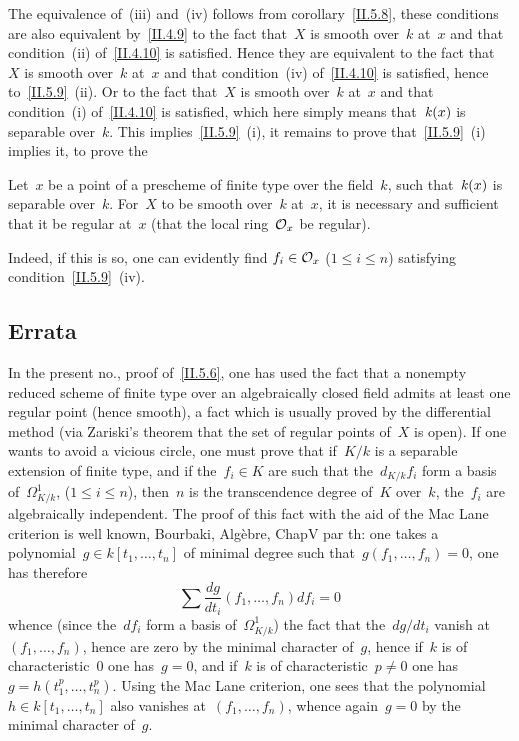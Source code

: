 The equivalence of~(iii) and~(iv) follows from
corollary~\ref{II.5.8}, these conditions are also equivalent
by~\ref{II.4.9} to the fact that~$X$ is smooth over~$k$ at~$x$ and
that condition~(ii)
of~\ref{II.4.10}
is satisfied. Hence they are equivalent to the fact that~$X$ is
smooth over~$k$ at~$x$ and that condition~(iv) of~\ref{II.4.10} is
satisfied, hence to~\ref{II.5.9}~(ii). Or to the fact that~$X$ is
smooth over~$k$ at~$x$ and that condition~(i) of~\ref{II.4.10} is
satisfied, which here simply means
that~$\kres(x)$
is
separable over~$k$. This implies~\ref{II.5.9}~(i), it remains to
prove that~\ref{II.5.9}~(i) implies it, \ie to prove the

\begin{corollary}
\label{II.5.10}
Let~$x$ be a point
of a
prescheme of finite type over the field~$k$, such
that~$\kres(x)$
is separable over~$k$. For~$X$ to be smooth over~$k$ at~$x$,
it is necessary and sufficient that it be regular at~$x$ (\ie that the local
ring~$\cal{O}_x$ be regular).
\end{corollary}

Indeed, if this is so, one can evidently find
$f_i\in \cal{O}_x$ ($1\leq i\leq n$) satisfying
condition~\ref{II.5.9}~(iv).

\subsection*{Errata}
\label{II.fin.errata}
In
the present no., proof of~\ref{II.5.6}, one
has used the fact that a nonempty reduced scheme of finite type
over an algebraically closed field admits at least one
regular point (hence smooth), a fact which is usually proved by
the differential method (via Zariski's theorem that
the set of regular points of~$X$ is open). If one wants
to avoid a vicious circle, one must prove that if~$K/k$ is
a separable extension of finite type, and if the~$f_i\in K$ are
such that the~$d_{K/k}f_i$ form a basis of~$\Omega^1_{K/k}$, ($1\leq
i\leq n$), then~$n$ is the transcendence degree of~$K$
over~$k$,
\ie the~$f_i$ are algebraically independent. The
proof of this fact with the aid of the
Mac\kern2pt Lane
criterion is well known, \cf Bourbaki, Alg\`ebre, Chap\ptbl V par th: one
takes a polynomial~$g\in k[t_1,\dots,t_n]$ of minimal
degree such that~$g(f_1,\dots,f_n)=0$, one has therefore
\[
\sum\frac{dg}{d t_i}(f_1,\dots,f_n) df_i=0
\]
whence (since the~$df_i$ form a basis of~$\Omega^1_{K/k}$) the
fact that the~$dg/d t_i$ vanish at~$(f_1,\dots,f_n)$, hence are zero
by the minimal character of~$g$, hence if~$k$ is of
characteristic~$0$ one has~$g=0$, and if~$k$ is of
characteristic~$p\neq 0$ one has~$g=h(t_1^p,\dots,t_n^p)$.
Using the
Mac\kern2pt Lane
criterion,
one sees that the
polynomial~$h\in k[t_1,\dots,t_n]$ also vanishes at~$(f_1,\dots,f_n)$,
whence again~$g=0$ by the minimal character of~$g$.
